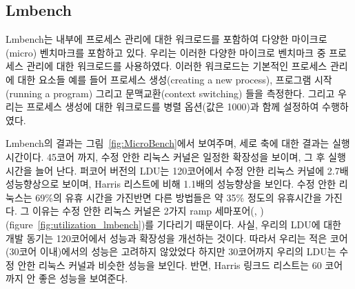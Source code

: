 \subsection{Lmbench}
Lmbench는 내부에 프로세스 관리에 대한 워크로드를 포함하여
 다양한 마이크로(micro) 벤치마크를 포함하고 있다. 
우리는 이러한 다양한 마이크로 벤치마크 중 프로세스 관리에 대한 워크로드를 사용하였다. 
이러한 워크로드는 기본적인 프로세스 관리에 대한 요소들 예를 들어 프로세스 생성(creating a new process),
 프로그램 시작(running a program) 그리고 문맥교환(context switching) 들을 측정한다.
그리고 우리는 프로세스 생성에 대한 워크로드를 병렬 옵션(값은 1000)과 함께 설정하여 수행하였다. 

Lmbench의 결과는 그림~\ref{fig:MicroBench}에서 보여주며, 세로 축에 대한 결과는 실행 시간이다.
45코어 까지, 수정 안한 리눅스 커널은 일정한 확장성을 보이며, 그 후 실행시간을 늘어 난다.
퍼코어 버전의 LDU는 120코어에서 수정 안한 리눅스 커널에 2.7배 성능향상으로
 보이며, Harris 리스트에 비해 1.1배의 성능향상을 보인다.
수정 안한 리눅스는 69\%의 유휴 시간을 가진반면 다른 방법들은 약 35\% 정도의 유휴시간을 가진다.
그 이유는 수정 안한 리눅스 커널은 2가지 ramp 세마포어(,
)(figure~\ref{fig:utilization_lmbench})를 기다리기 때문이다. 
사실, 우리의 LDU에 대한 개발 동기는 120코어에서 성능과 확장성을 개선하는 것이다. 
따라서 우리는 적은 코어(30코어 이내)에서의 성능은 고려하지 않았었다
하지만 30코어까지 우리의 LDU는 수정 안한 리눅스 커널과 비슷한 성능을 보인다. 
반면, Harris 링크드 리스트는 60 코어 까지 안 좋은 성능을 보여준다. 


